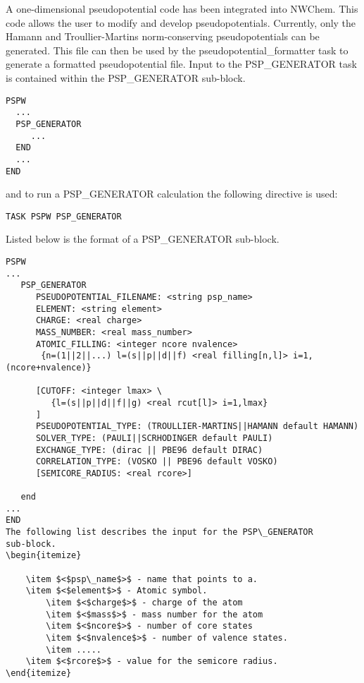 A one-dimensional pseudopotential code has been integrated into NWChem.
This code allows the user to modify and develop pseudopotentials.  Currently, 
only the Hamann and Troullier-Martins norm-conserving pseudopotentials can be
generated.  This file can then be used by the pseudopotential\_formatter 
task to generate a formatted pseudopotential file. 
Input to the PSP\_GENERATOR task is contained
within the PSP\_GENERATOR sub-block.
\begin{verbatim}
PSPW
  ...
  PSP_GENERATOR
     ...
  END
  ...
END
\end{verbatim}
and to run a PSP\_GENERATOR calculation the following directive 
is used:
\begin{verbatim}
TASK PSPW PSP_GENERATOR
\end{verbatim}
Listed below is the format of a PSP\_GENERATOR sub-block.
\begin{verbatim}
PSPW
... 
   PSP_GENERATOR
      PSEUDOPOTENTIAL_FILENAME: <string psp_name>
      ELEMENT: <string element>
      CHARGE: <real charge>
      MASS_NUMBER: <real mass_number>
      ATOMIC_FILLING: <integer ncore nvalence>
       {n=(1||2||...) l=(s||p||d||f) <real filling[n,l]> i=1,(ncore+nvalence)}
      
      [CUTOFF: <integer lmax> \
         {l=(s||p||d||f||g) <real rcut[l]> i=1,lmax}
      ]
      PSEUDOPOTENTIAL_TYPE: (TROULLIER-MARTINS||HAMANN default HAMANN)
      SOLVER_TYPE: (PAULI||SCRHODINGER default PAULI)
      EXCHANGE_TYPE: (dirac || PBE96 default DIRAC)
      CORRELATION_TYPE: (VOSKO || PBE96 default VOSKO)
      [SEMICORE_RADIUS: <real rcore>]
      
   end
... 
END
The following list describes the input for the PSP\_GENERATOR
sub-block.
\begin{itemize}

	\item $<$psp\_name$>$ - name that points to a.
	\item $<$element$>$ - Atomic symbol.
        \item $<$charge$>$ - charge of the atom
        \item $<$mass$>$ - mass number for the atom
        \item $<$ncore$>$ - number of core states
        \item $<$nvalence$>$ - number of valence states.
        \item .....
	\item $<$rcore$>$ - value for the semicore radius. 
\end{itemize}



\end{verbatim}




